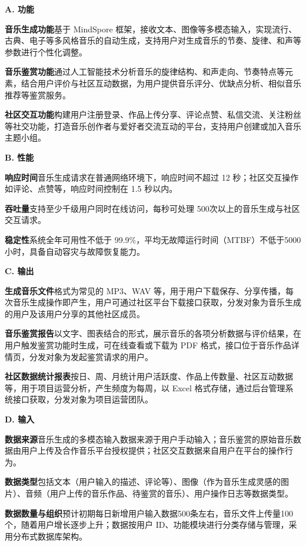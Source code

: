 \documentclass{base}
\begin{document}
\textbf{A. 功能}

\textbf{音乐生成功能}\quad 基于 MindSpore 框架，接收文本、图像等多模态输入，实现流行、古典、电子等多风格音乐的自动生成，支持用户对生成音乐的节奏、旋律、和声等参数进行个性化调整。

\textbf{音乐鉴赏功能}\quad 通过人工智能技术分析音乐的旋律结构、和声走向、节奏特点等元素，结合用户评价与社区互动数据，为用户提供音乐评分、优缺点分析、相似音乐推荐等鉴赏服务。​

\textbf{社区交互功能}\quad 构建用户注册登录、作品上传分享、评论点赞、私信交流、关注粉丝等社交功能，打造音乐创作者与爱好者交流互动的平台，支持用户创建或加入音乐主题小组。

\textbf{B. 性能}

\textbf{响应时间}\quad 音乐生成请求在普通网络环境下，响应时间不超过 12 秒；社区交互操作如评论、点赞等，响应时间控制在 1.5 秒以内。

\textbf{吞吐量}\quad 支持至少千级用户同时在线访问，每秒可处理 500次以上的音乐生成与社区交互请求。

\textbf{稳定性}\quad 系统全年可用性不低于 99.9\%，平均无故障运行时间（MTBF）不低于5000小时，具备自动容灾与故障恢复能力。

\textbf{C. 输出}

\textbf{生成音乐文件}\quad 格式为常见的 MP3、WAV 等，用于用户下载保存、分享传播，每次音乐生成操作即产生，用户可通过社区平台下载接口获取，分发对象为音乐生成的用户及该用户分享的其他社区成员。

\textbf{音乐鉴赏报告}\quad 以文字、图表结合的形式，展示音乐的各项分析数据与评价结果，在用户触发鉴赏功能时生成，可在线查看或下载为 PDF 格式，接口位于音乐作品详情页，分发对象为发起鉴赏请求的用户。​

\textbf{社区数据统计报表}\quad 按日、周、月统计用户活跃度、作品上传数量、社区互动数据等，用于项目运营分析，产生频度为每周，以 Excel 格式存储，通过后台管理系统接口获取，分发对象为项目运营团队。

\textbf{D. 输入}

\textbf{数据来源}\quad 音乐生成的多模态输入数据来源于用户手动输入；音乐鉴赏的原始音乐数据由用户上传及合作音乐平台授权提供；社区交互数据来自用户在平台的操作行为。​

\textbf{数据类型}\quad 包括文本（用户输入的描述、评论等）、图像（作为音乐生成灵感的图片）、音频（用户上传的音乐作品、待鉴赏的音乐）、用户操作日志等数据类型。​

\textbf{数据数量与组织}\quad 预计初期每日新增用户输入数据500条左右，音乐文件上传量100个，随着用户增长逐步上升；数据按用户 ID、功能模块进行分类存储与管理，采用分布式数据库架构。
\end{document}

